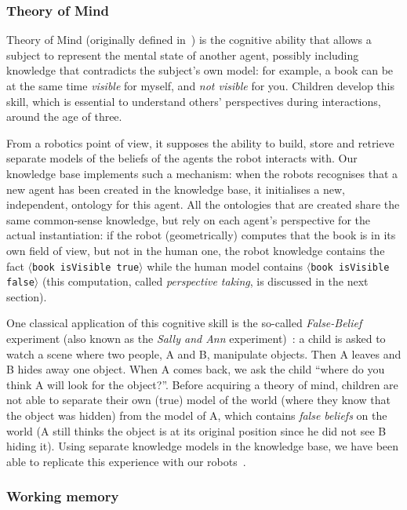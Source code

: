 \documentclass[preprint,3p,times]{elsarticle}
\newcommand{\stmt}[1]{{\footnotesize\tt$\langle$#1\relax$\rangle$}}
\begin{document}
\subsubsection{Theory of Mind}
\label{sect|tom}

Theory of Mind (originally defined in~\cite{Premack1978}) is the cognitive
ability that allows a subject to represent the mental state of another
agent, possibly including knowledge that contradicts the subject's own model: for
example, a book can be at the same time \emph{visible} for myself, and \emph{not
visible} for you. Children develop this skill, which is essential to understand others' perspectives during
interactions, around the age of three. 

From a robotics point of view, it supposes the ability to build, store and
retrieve separate models of the beliefs of the agents the robot interacts with.
Our knowledge base implements such a mechanism: when the robots recognises that
a new agent has been created in the knowledge base, it initialises a new,
independent, ontology for this agent. All the ontologies that are created share
the same common-sense knowledge, but rely on each agent's perspective for the
actual instantiation: if the robot (geometrically) computes that the book is in its
own field of view, but not in the human one, the robot knowledge contains the
fact \stmt{book isVisible true} while the human model contains \stmt{book
isVisible false} (this computation, called \emph{perspective taking}, is
discussed in the next section).

One classical application of this cognitive skill is the so-called
\emph{False-Belief} experiment (also known as the \emph{Sally and Ann}
experiment)~\cite{Leslie2000}: a child is asked to watch a scene where two
people, A and B, manipulate objects. Then A leaves and B hides away one
object. When A comes back, we ask the child ``where do you think A will
look for the object?''. Before acquiring a theory of mind, children are not
able to separate their own (true) model of the world (where they know that
the object was hidden) from the model of A, which contains \emph{false
beliefs} on the world (A still thinks the object is at its original
position since he did not see B hiding it). Using separate knowledge models
in the knowledge base, we have been able to replicate this experience with
our robots~\cite{warnier2012when}.

\subsubsection{Working memory}
\label{memory}
\end{document}
